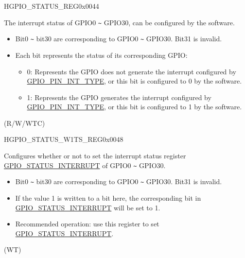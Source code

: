 \begin{register}{H}{GPIO\_STATUS\_REG}{0x0044}\label{regdesc:GPIOSTATUSREG}
%
\regnewline%
\begin{regdesc}\begin{reglist}
\label{fielddesc:GPIOSTATUSINTERRUPT}\item [GPIO\_STATUS\_INTERRUPT] The interrupt status of GPIO0 \verb+~+ GPIO30, can be configured by the software. 
\begin{itemize}
    \item Bit0 \verb+~+ bit30 are corresponding to GPIO0 \verb+~+ GPIO30. Bit31 is invalid. 
    \item Each bit represents the status of its corresponding GPIO:
    \begin{itemize}
        \item 0: Represents the GPIO does not generate the interrupt configured by \hyperref[fielddesc:GPIOPINNINTTYPE]{GPIO\_PIN\_INT\_TYPE}, or this bit is configured to 0 by the software.
        \item 1: Represents the GPIO generates the interrupt configured by \hyperref[fielddesc:GPIOPINNINTTYPE]{GPIO\_PIN\_INT\_TYPE}, or this bit is configured to 1 by the software.
    \end{itemize}
\end{itemize}
(R/W/WTC)
\end{reglist}\end{regdesc}
\end{register}


\begin{register}{H}{GPIO\_STATUS\_W1TS\_REG}{0x0048}\label{regdesc:GPIOSTATUSW1TSREG}
%
\regnewline%
\begin{regdesc}\begin{reglist}
\label{fielddesc:GPIOSTATUSW1TS}\item [GPIO\_STATUS\_W1TS] Configures whether or not to set the interrupt status register \hyperref[fielddesc:GPIOSTATUSINTERRUPT]{GPIO\_STATUS\_INTERRUPT} of GPIO0 \verb+~+ GPIO30. 
\begin{itemize}
    \item Bit0 \verb+~+ bit30 are corresponding to GPIO0 \verb+~+ GPIO30. Bit31 is invalid.
    \item If the value 1 is written to a bit here, the corresponding bit in \hyperref[fielddesc:GPIOSTATUSINTERRUPT]{GPIO\_STATUS\_INTERRUPT} will be set to 1. \item Recommended operation: use this register to set \hyperref[fielddesc:GPIOSTATUSINTERRUPT]{GPIO\_STATUS\_INTERRUPT}. 
\end{itemize}
(WT)
\end{reglist}\end{regdesc}
\end{register}


